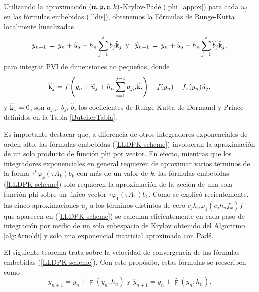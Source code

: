 Utilizando la aproximación $(\mathfrak{m} , \mathfrak{p} ,\mathfrak{q} , k)$-Krylov-Padé (\ref{phi_appox}) para cada $u_j$ en las fórmulas embebidas (\ref{lldis}), obtenemos la Fórmulas de Runge-Kutta localmente linealizadas 
\begin{equation}  \label{LLDPK scheme}
    y_{n+1}\,=\,y_n+\widetilde{u}_s+h_n \sum_{j=1}^{s}b_j \widetilde{\mathtt{k}}_j \,\,\, \text{y} \,\,\, \
    \widehat{y}_{n+1}\,=\, y_n+\widetilde{u}_s+h_n \sum_{j=1}^{s}\widehat{b}_j \widetilde{\mathtt{k}}_j,
\end{equation}
para integrar PVI de dimensiones no pequeñas, donde
\begin{equation*}
    \widetilde{\mathtt{k}}_j = f\left( y_n+\widetilde{u}_j+h_n \sum_{i=1}^{j-1}a_{j,i}\widetilde{\mathtt{k}}_i \right) - f( y_n) - f_x(y_n)\widetilde{u}_j.
\end{equation*}
y $\widetilde{\mathtt{k}}_1=0$, son $a_{j,i}$, $b_j$, $\widehat{b}_j$ los coeficientes de Runge-Kutta de  Dormand y Prince definidos en la Tabla \ref{ButcherTabla}.

Es importante destacar que, a diferencia de otros integradores exponenciales de orden alto, las fórmulas embebidas (\ref{LLDPK scheme}) involucran la aproximación de un solo producto de función phi por vector. En efecto, mientras que los integradores exponenciales en general requieren de aproximar varios términos de la forma $\tau^k \varphi_k(\tau A_k)b_k$ con más de un valor de $k$, las fórmulas embebidas (\ref{LLDPK scheme}) solo requieren la aproximación de la acción de una sola función phi sobre un único vector $\tau \varphi_1(\tau A_1)b_1$. Como se explicó recientemente, las cinco aproximaciones $\widetilde{u}_j$ a los términos distintos de cero $c_jh_n\varphi_1(c_jh_nf_x)f$ que aparecen en (\ref{LLDPK scheme}) se calculan eficientemente en cada paso de integración por medio de un solo subespacio de Krylov obtenido del Algoritmo \ref{alg:Arnoldi} y solo una exponencial matricial aproximada con Padé.

El siguiente teorema trata sobre la velocidad de convergencia de las fórmulas embebidas (\ref{LLDPK scheme}). Con este propósito, estas fórmulas se reescriben como
\begin{equation*}
    y_{n+1}=y_{n}+\digamma (y_{n};h_{n})\text{ \ \ \ \ y \ \ \ \ }\widehat{y}_{n+1}=y_{n}+\widehat{\digamma }(y_{n};h_{n}).
\end{equation*}


